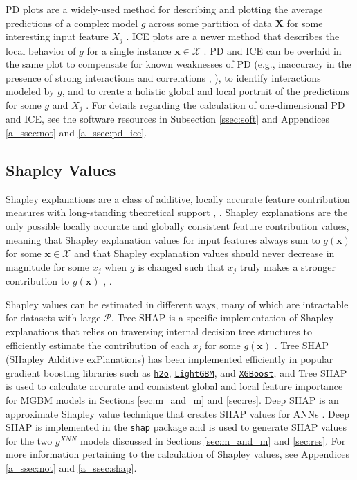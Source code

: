 \documentclass[information,article,submit,moreauthors,pdftex]{definitions/mdpi}
\begin{document}
PD plots are a widely-used method for describing and plotting the average predictions of a complex model $g$ across some partition of data $\mathbf{X}$ for some interesting input feature $X_j$ \cite{esl}. ICE plots are a newer method that describes the local behavior of $g$ for a single instance $\mathbf{x} \in \mathcal{X}$ \cite{ice_plots}. PD and ICE can be overlaid in the same plot to compensate for known weaknesses of PD (e.g., inaccuracy in the presence of strong interactions and correlations \cite{ice_plots}, \cite{ale_plot}), to identify interactions modeled by $g$, and to create a holistic global and local portrait of the predictions for some $g$ and $X_j$ \cite{ice_plots}. For details regarding the calculation of one-dimensional PD and ICE, see the software resources in Subsection \ref{ssec:soft} and Appendices \ref{a_ssec:not} and \ref{a_ssec:pd_ice}.

\subsection{Shapley Values}\label{ssec:shap}

Shapley explanations are a class of additive, locally accurate feature contribution measures with long-standing theoretical support \cite{shapley}, \cite{shapley1988shapley}. Shapley explanations are the only possible locally accurate and globally consistent feature contribution values, meaning that Shapley explanation values for input features always sum to $g(\mathbf{x})$ for some $\mathbf{x} \in \mathcal{X}$ and that Shapley explanation values should never decrease in magnitude for some $x_j$ when $g$ is changed such that $x_j$ truly makes a stronger contribution to $g(\mathbf{x})$ \cite{shapley}, \cite{tree_shap}. 

Shapley values can be estimated in different ways, many of which are intractable for datasets with large $\mathcal{P}$. Tree SHAP is a specific implementation of Shapley explanations that relies on traversing internal decision tree structures to efficiently estimate the contribution of each $x_j$ for some $g(\mathbf{x})$ \cite{tree_shap}. Tree SHAP (SHapley Additive exPlanations) has been implemented efficiently in popular gradient boosting libraries such as \href{http://docs.h2o.ai/h2o/latest-stable/h2o-py/docs/modeling.html#h2ogradientboostingestimator}{\texttt{h2o}}, \href{https://lightgbm.readthedocs.io/en/latest/Python-Intro.html}{\texttt{LightGBM}}, and \href{https://xgboost.readthedocs.io/en/latest/python/python_intro.html}{\texttt{XGBoost}}, and Tree SHAP is used to calculate accurate and consistent global and local feature importance for MGBM models in Sections \ref{sec:m_and_m} and \ref{sec:res}. Deep SHAP is an approximate Shapley value technique that creates SHAP values for ANNs \cite{shapley}. Deep SHAP is implemented in the \href{https://github.com/slundberg/shap}{\texttt{shap}} package and is used to generate SHAP values for the two $g^{XNN}$ models discussed in Sections \ref{sec:m_and_m} and \ref{sec:res}. For more information pertaining to the calculation of Shapley values, see Appendices \ref{a_ssec:not} and \ref{a_ssec:shap}.
\end{document}
